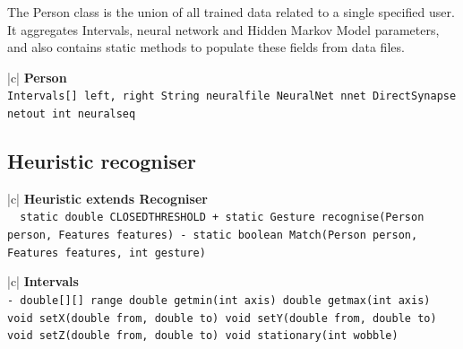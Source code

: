 \documentclass[12pt,a4,notitlepage]{report}
\renewcommand{\_}{\texttt{\symbol{95}}}
\newcommand{\<}{\texttt{\symbol{60}}}
\renewcommand{\>}{\texttt{\symbol{62}}}
\newcommand{\class}[1]{\textbf{#1}}
\newcommand{\variable}[1]{\texttt{#1}}
\begin{document}
{The Person class is the union of all trained data related to a single specified user. It aggregates Intervals, neural network and Hidden Markov Model parameters, and also contains static methods to populate these fields from data files.

\begin{tabular}{|c|} \hline 
\class{Person} \\ \hline
{}
{\variable{Intervals[] left, right \newline String neural\_file \newline NeuralNet nnet \newline DirectSynapse netout \newline int neural\_seq 
} } \\ \hline
\end{tabular}

\newpage

\subsection{Heuristic recogniser}

\begin{tabular}{|c|} \hline 
\class{Heuristic extends Recogniser} \\ \hline
{}
{\variable{\ \ static double CLOSED\_THRESHOLD \newline
 + static Gesture recognise(Person person, Features features) \newline
 - static boolean Match(Person person, Features features, int gesture)
} } \\ \hline
\end{tabular}

\begin{tabular}{|c|} \hline 
\class{Intervals} \\ \hline
{}
{\variable{- double[][] range \newline
  double get\_min(int axis) \newline
  double get\_max(int axis) \newline
  void setX(double from, double to) \newline
  void setY(double from, double to) \newline
  void setZ(double from, double to) \newline
  void stationary(int wobble)
} } \\ \hline
\end{tabular}

}
\end{document}
